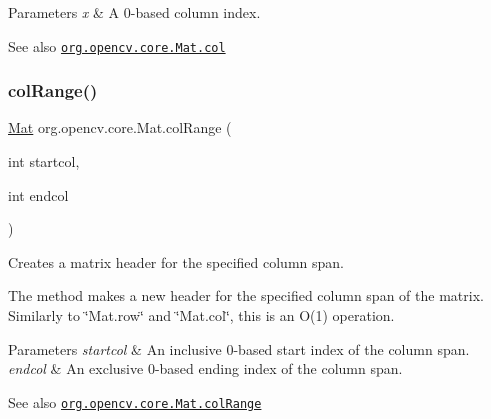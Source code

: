 \begin{DoxyParams}{Parameters}
{\em x} & A 0-\/based column index.\\
\hline
\end{DoxyParams}
\begin{DoxySeeAlso}{See also}
\href{http://docs.opencv.org/modules/core/doc/basic_structures.html#mat-col}{\tt org.\+opencv.\+core.\+Mat.\+col} 
\end{DoxySeeAlso}
\mbox{\label{classorg_1_1opencv_1_1core_1_1_mat_a28a58bdd7241151451c966e41da7e38b}} 
\subsubsection{\texorpdfstring{col\+Range()}{colRange()}\hspace{0.1cm}{\footnotesize\ttfamily [1/2]}}
{\footnotesize\ttfamily \mbox{\hyperlink{classorg_1_1opencv_1_1core_1_1_mat}{Mat}} org.\+opencv.\+core.\+Mat.\+col\+Range (\begin{DoxyParamCaption}\item[{int}]{startcol,  }\item[{int}]{endcol }\end{DoxyParamCaption})}

Creates a matrix header for the specified column span.

The method makes a new header for the specified column span of the matrix. Similarly to \char`\"{}\+Mat.\+row\char`\"{} and \char`\"{}\+Mat.\+col\char`\"{}, this is an O(1) operation.


\begin{DoxyParams}{Parameters}
{\em startcol} & An inclusive 0-\/based start index of the column span. \\
\hline
{\em endcol} & An exclusive 0-\/based ending index of the column span.\\
\hline
\end{DoxyParams}
\begin{DoxySeeAlso}{See also}
\href{http://docs.opencv.org/modules/core/doc/basic_structures.html#mat-colrange}{\tt org.\+opencv.\+core.\+Mat.\+col\+Range} 
\end{DoxySeeAlso}
\mbox{\label{classorg_1_1opencv_1_1core_1_1_mat_a2be44d10bfd5d8fa88d022b3b4dc773e}} 
